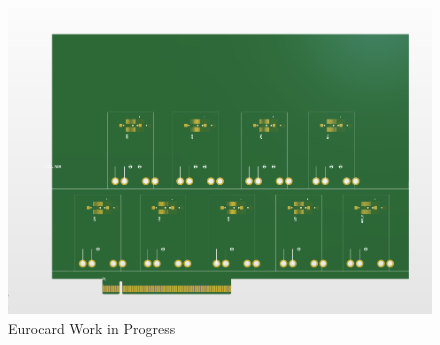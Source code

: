 \documentclass[a4paper,11pt]{article}
\begin{document}
\begin{figure}[htbp]
\centering
\includegraphics[scale=0.5]{EurocardWIP.png}
\caption{Eurocard Work in Progress\label{fig:EurocardWIP}}
\end{figure}










\appendix













\printbibliography
\end{document}
